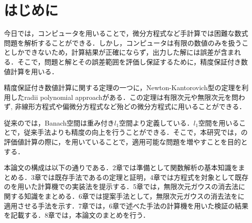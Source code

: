 \chapter{はじめに}

今日では，コンピュータを用いることで，微分方程式など手計算では困難な数式問題を解析することができる．しかし，コンピュータは有限の数値のみを扱うことしかできないため，計算結果が正確にならず，出力した解には誤差が含まれる．そこで，問題と解とその誤差範囲を評価し保証するために，精度保証付き数値計算を用いる\cite{b1}．

精度保証付き数値計算に関する定理の一つに，Newton-Kantorovich型の定理を利用したradii polynomial approachがある．この定理は有限次元や無限次元を問わず, 非線形方程式や偏微分方程式など殆どの微分方程式に用いることができる．

従来の\rad{}では，Banach空間は重み付き$l_1$空間より定義している．$l_1$空間を用いることで，従来手法よりも精度の向上を行うことができる．そこで，本研究では，\rad{}の評価値計算の際に，\infg{}を用いていることで，適用可能な問題を増やすことを目的とする．


本論文の構成は以下の通りである．2章では準備として関数解析の基本知識をまとめる．3章では既存手法である\rad{}の定理と証明，4章では\vdp{}方程式を対象として既存の\rad{}を用いた計算機での実装法を提示する．5章では，無限次元ガウスの消去法に関する知識をまとめる．6章では提案手法として，無限次元ガウスの消去法を\rad{}に適用させる手法を示す．7章では，6章で述べた手法の計算機を用いた検証の結果を記載する．8章では，本論文のまとめを行う．